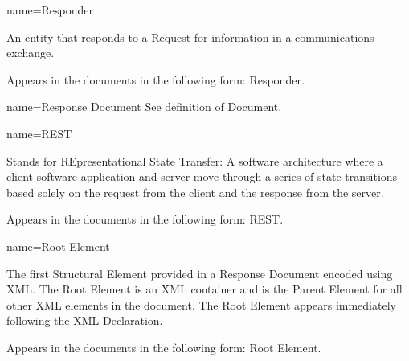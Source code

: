 {
  name={Responder}
}
{
	An entity that responds to a Request for information in a communications exchange.

	Appears in the documents in the following form: Responder.
}


{
  name={Response Document}
}
{
	See definition of Document.
}


{
  name={REST}
}
{
	Stands for REpresentational State Transfer:  A software architecture where a client software application and server move through a series of state transitions based solely on the request from the client and the response from the server. 

	Appears in the documents in the following form: REST.
}


{
  name={Root Element}
}
{
	The first Structural Element provided in a Response Document encoded using XML.  The Root Element is an XML container and is the Parent Element for all other XML elements in the document.  The Root Element appears immediately following the XML Declaration.

	Appears in the documents in the following form: Root Element.
}


